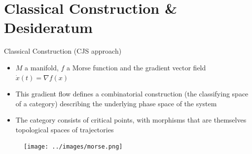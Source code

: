 \documentclass{beamer}
\begin{document}
\section{Classical Construction \& Desideratum}
\begin{frame}{Classical Construction (CJS approach)}
        \begin{minipage}[b]{0.4\linewidth}
    \begin{itemize}
        \item<1-> $M$ a manifold, $f$ a Morse function and the gradient vector field $\dot{x}(t) = \nabla f(x)$ 
        \item<2-> This gradient flow defines a combinatorial construction (the classifying space 
            of a category) describing the underlying 
            phase space of the system 
        \item<3-> The category consists of critical points, with morphisms that are themselves
            topological spaces of trajectories 
    \end{itemize}
        \end{minipage}
        \hspace{0.5cm}
        \begin{minipage}[b]{0.4\linewidth}
            \begin{figure}
            \texttt{[image: ../images/morse.png]}
            \end{figure}
        \end{minipage}
\end{frame}

\end{document}
